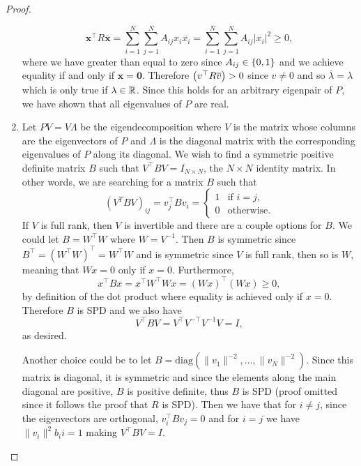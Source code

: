 \documentclass[12pt]{report}
\newenvironment{problem}{}{\newpage}
\begin{document}
\begin{problem}
\begin{proof}
\begin{enumerate}
    \begin{equation*}
        \mathbf{x}^\top R \overline{\mathbf{x}} = \sum_{i=1}^N \sum_{j=1}^N A_{i j} x_i\overline{x_i} = \sum_{i=1}^N \sum_{j=1}^N A_{i j} |x_i|^2 \geq 0,
    \end{equation*}
    where we have greater than equal to zero since $A_{i j} \in {\left\{0,1\right\}}$ and we achieve equality if and only if $\mathbf{x} = \mathbf{0}$. Therefore ${\left(v^\top R\overline{v}\right)} > 0$ since $v \neq 0$ and so $\overline{\lambda} = \lambda$ which is only true if $\lambda \in {\mathbb R}$. Since this holds for an arbitrary eigenpair of $P$, we have shown that all eigenvalues of $P$ are real. 


    \item
    Let $PV = V \Lambda$ be the eigendecomposition where $V$ is the matrix whose columns are the eigenvectors of $P$ and $\Lambda$ is the diagonal matrix with the corresponding eigenvalues of $P$ along its diagonal. We wish to find a symmetric positive definite matrix $B$ such that $V^\top B V = I_{N \times N}$, the $N \times N$ identity matrix. In other words, we are searching for a matrix $B$ such that
    \begin{equation*}
        (V^T B V)_{ij} = v_j^\top B v_i = \begin{cases}
            1 &\text{if } i = j,\\
            0 &\text{otherwise.}
        \end{cases}
    \end{equation*}
    If $V$ is  full rank, then $V$ is invertible and there are a couple options for $B$. We could let $B =W^\top W$ where $W = V^{-1}$. Then $B$ is symmetric since $B^\top = (W^\top W)^\top = W^\top W$ and is symmetric since $V$ is full rank, then so is $W$, meaning that $Wx = 0$ only if $x=0$. Furthermore, 
    \begin{equation*}
        x^\top B x = x^\top W^\top W x = (Wx)^\top (Wx) \geq 0,
    \end{equation*}
    by definition of the dot product where equality is achieved only if $x = 0$. Therefore $B$ is SPD and we also have
    \begin{equation*}
        V^\top B V = V^\top V^{-\top} V^{-1} V = I,
    \end{equation*}
    as desired. 

    \noindent
    Another choice could be to let $B = \text{diag}(\|v_1\|^{-2},\dots,\|v_N\|^{-2})$. Since this matrix is diagonal, it is symmetric and since the elements along the main diagonal are positive, $B$ is positive definite, thus $B$ is SPD (proof omitted since it follows the proof that $R$ is SPD). Then we have that for $i\neq j$, since the eigenvectors are orthogonal, $v_i^\top B v_j = 0$ and for $i = j$ we have $\|v_i\|^2 b_ii = 1$ making $V^\top B V = I$.
    

\end{enumerate}
\end{proof}
\end{problem}
\end{document}
